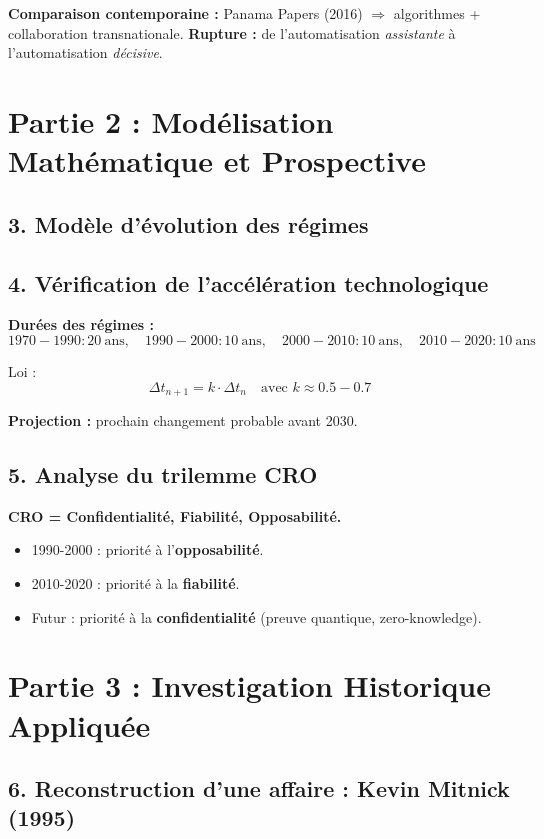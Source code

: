 \documentclass[12pt,a4paper]{article}
\begin{document}
	\textbf{Comparaison contemporaine :} Panama Papers (2016) $\Rightarrow$ algorithmes + collaboration transnationale.  
	\textbf{Rupture :} de l’automatisation \textit{assistante} à l’automatisation \textit{décisive}.  
	
	\section*{Partie 2 : Modélisation Mathématique et Prospective}
	
	\subsection*{3. Modèle d’évolution des régimes}
	
	
	\subsection*{4. Vérification de l’accélération technologique}
	
	\textbf{Durées des régimes :}
	\[
	1970-1990 : 20 \ \text{ans}, \quad
	1990-2000 : 10 \ \text{ans}, \quad
	2000-2010 : 10 \ \text{ans}, \quad
	2010-2020 : 10 \ \text{ans}
	\]
	
	Loi : 
	\[
	\Delta t_{n+1} = k \cdot \Delta t_n \quad \text{avec } k \approx 0.5-0.7
	\]
	
	\textbf{Projection :} prochain changement probable avant 2030.
	
	\subsection*{5. Analyse du trilemme CRO}
	
	\textbf{CRO = Confidentialité, Fiabilité, Opposabilité.}
	
	\begin{itemize}
		\item 1990-2000 : priorité à l’\textbf{opposabilité}.
		\item 2010-2020 : priorité à la \textbf{fiabilité}.
		\item Futur : priorité à la \textbf{confidentialité} (preuve quantique, zero-knowledge).
	\end{itemize}
	
	\section*{Partie 3 : Investigation Historique Appliquée}
	
	\subsection*{6. Reconstruction d’une affaire : Kevin Mitnick (1995)}
	
\end{document}

